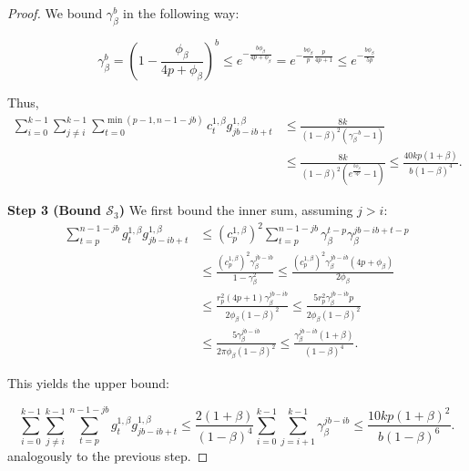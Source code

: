 \documentclass{article} %
\begin{document}
\begin{proof}
We bound $\gamma_{\beta}^{b}$ in the following way:

\begin{equation}
    \gamma_{\beta}^b = \left(1 - \frac{\phi_{\beta}}{4p + \phi_{\beta}}\right)^b \le e^{-\frac{b\phi_{\beta}}{4p + \phi_{\beta}}} = e^{-\frac{b\phi_{\beta}}{p} \frac{p}{4p + 1}} \le e^{-\frac{b\phi_{\beta}}{5p}}
\end{equation}

Thus,
\begin{equation}
\begin{aligned}
    \sum\limits_{i = 0}^{k - 1}\sum\limits_{j \ne i}^{k - 1}\sum\limits_{t = 0}^{\min(p - 1, n - 1 - jb)} c^{1, \beta}_{t} g^{1,\beta}_{jb - ib + t}  &\le \frac{8k}{(1 - \beta)^2(\gamma_{\beta}^{-b} - 1)} \\
    &\le \frac{8k}{(1 - \beta)^2(e^{\frac{b\phi_{\beta}}{5p}} - 1)} \le \frac{40kp(1 + \beta)}{b(1 - \beta)^4}.
\end{aligned}
\end{equation}



\textbf{Step 3 (Bound $\mathcal{S}_3$)}
We first bound the inner sum, assuming $j > i$:
\begin{equation}
\begin{aligned}
    \sum\limits_{t = p}^{n - 1 - jb} g^{1, \beta}_{t} g^{1,\beta}_{jb - ib + t}&\le (c_{p}^{1,\beta})^2\sum\limits_{t = p}^{n - 1 - jb} \gamma_{\beta}^{t - p}\gamma_{\beta}^{jb - ib + t - p} \\
    &\le \frac{(c^{1,\beta}_p)^2\gamma_{\beta}^{jb - ib}}{1 - \gamma_{\beta}^2} \le \frac{(c^{1,\beta}_p)^2\gamma_{\beta}^{jb - ib}(4p + \phi_{\beta})}{2\phi_{\beta}}\\
    &\le \frac{r^2_p(4p + 1)\gamma_{\beta}^{jb - ib}}{2\phi_{\beta}( 1 - \beta)^2}
    \le \frac{5r_p^2\gamma_{\beta}^{jb - ib}p}{2\phi_{\beta}( 1 - \beta)^2} \\
    &\le \frac{5\gamma_{\beta}^{jb - ib}}{2\pi \phi_{\beta}( 1 - \beta)^2} \le \frac{\gamma_{\beta}^{jb - ib}(1 + \beta)}{( 1 - \beta)^4}.
\end{aligned}
\end{equation}

This yields the upper bound:

\begin{equation}
    \sum\limits_{i = 0}^{k - 1}\sum\limits_{j \ne i}^{k - 1}\sum\limits_{t = p}^{n - 1 - jb} g^{1, \beta}_{t} g^{1, \beta}_{jb - ib + t} \le \frac{2(1 + \beta)}{(1 - \beta)^4}\sum\limits_{i = 0}^{k - 1}\sum\limits_{j = i + 1}^{k - 1}\gamma_{\beta}^{jb - ib} \le \frac{10kp(1 + \beta)^2}{b(1 - \beta)^6}.
\end{equation}
analogously to the previous step.


\end{proof}
\end{document}
